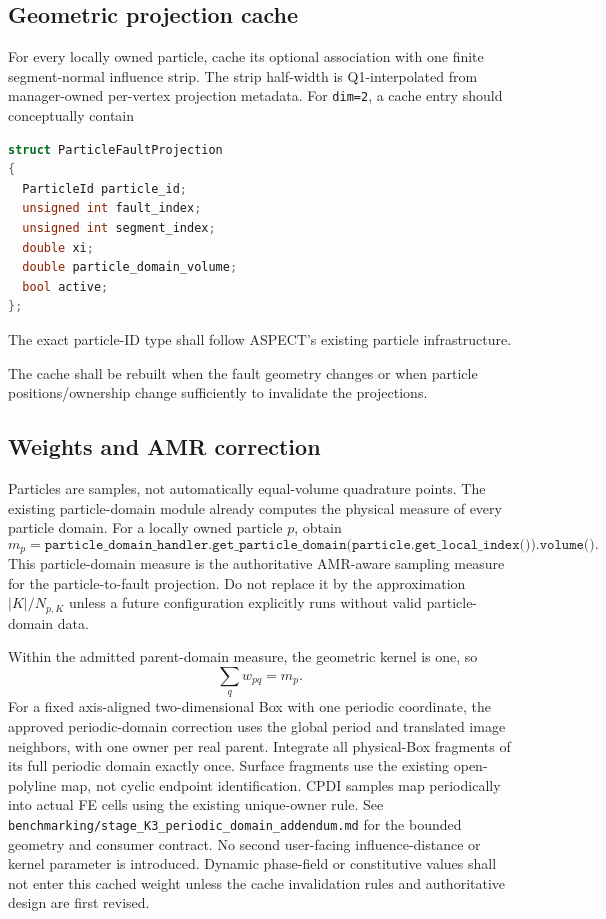 \documentclass[11pt]{article}
\begin{document}
\subsection{Geometric projection cache}
For every locally owned particle, cache its optional association with one
finite segment-normal influence strip. The strip half-width is Q1-interpolated
from manager-owned per-vertex projection metadata. For \texttt{dim=2}, a
cache entry should conceptually contain
\begin{lstlisting}[language=C++]
struct ParticleFaultProjection
{
  ParticleId particle_id;
  unsigned int fault_index;
  unsigned int segment_index;
  double xi;
  double particle_domain_volume;
  bool active;
};
\end{lstlisting}

The exact particle-ID type shall follow ASPECT's existing particle infrastructure.

The cache shall be rebuilt when the fault geometry changes or when particle positions/ownership change sufficiently to invalidate the projections.

\subsection{Weights and AMR correction}
Particles are samples, not automatically equal-volume quadrature points.  The existing particle-domain module already computes the physical measure of every particle domain.  For a locally owned particle $p$, obtain
\[
\boxed{
m_p
=
\texttt{particle\_domain\_handler.get\_particle\_domain(}
\texttt{particle.get\_local\_index()).volume()}.
}
\]
This particle-domain measure is the authoritative AMR-aware sampling measure for the particle-to-fault projection.  Do not replace it by the approximation $|K|/N_{p,K}$ unless a future configuration explicitly runs without valid particle-domain data.

Within the admitted parent-domain measure, the geometric kernel is one, so
\[
\sum_q w_{pq}=m_p.
\]
For a fixed axis-aligned two-dimensional Box with one periodic coordinate,
the approved periodic-domain correction uses the global period and translated
image neighbors, with one owner per real parent. Integrate all physical-Box
fragments of its full periodic domain exactly once. Surface fragments use the
existing open-polyline map, not cyclic endpoint identification. CPDI samples
map periodically into actual FE cells using the existing unique-owner rule.
See \texttt{benchmarking/stage\_K3\_periodic\_domain\_addendum.md} for the
bounded geometry and consumer contract.
No second user-facing influence-distance or kernel parameter is introduced.
Dynamic phase-field or constitutive values shall not enter this cached weight
unless the cache invalidation rules and authoritative design are first revised.
\end{document}
